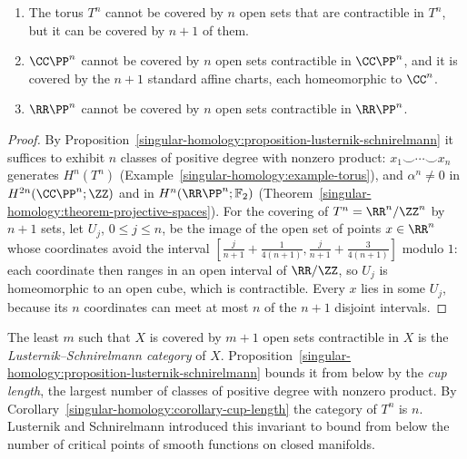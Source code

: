 \begin{corollary}\label{singular-homology:corollary-cup-length}
\begin{enumerate}
\item The torus $T^n$ cannot be covered by $n$ open sets that are contractible in $T^n$, but it can be covered by $n + 1$ of them.
\item $\CC\PP^n$ cannot be covered by $n$ open sets contractible in $\CC\PP^n$, and it is covered by the $n + 1$ standard affine charts, each homeomorphic to $\CC^n$.
\item $\RR\PP^n$ cannot be covered by $n$ open sets contractible in $\RR\PP^n$.
\end{enumerate}
\end{corollary}

\begin{proof}
By Proposition~\ref{singular-homology:proposition-lusternik-schnirelmann} it suffices to exhibit $n$ classes of positive degree with nonzero product: $x_1 \smile \cdots \smile x_n$ generates $H^n(T^n)$
(Example~\ref{singular-homology:example-torus}), and $\alpha^n \neq 0$ in $H^{2n}(\CC\PP^n; \ZZ)$ and in $H^n(\RR\PP^n; \mathbb{F}_2)$ (Theorem~\ref{singular-homology:theorem-projective-spaces}). For the
covering of $T^n = \RR^n/\ZZ^n$ by $n + 1$ sets, let $U_j$, $0 \leq j \leq n$, be the image of the open set of points $x \in \RR^n$ whose coordinates avoid the interval
$[\frac{j}{n+1} + \frac{1}{4(n+1)}, \frac{j}{n+1} + \frac{3}{4(n+1)}]$ modulo $1$: each coordinate then ranges in an open interval of $\RR/\ZZ$, so $U_j$ is homeomorphic to an open cube, which is contractible.
Every $x$ lies in some $U_j$, because its $n$ coordinates can meet at most $n$ of the $n + 1$ disjoint intervals.
\end{proof}

\begin{remark}\label{singular-homology:remark-ls-category}
The least $m$ such that $X$ is covered by $m + 1$ open sets contractible in $X$ is the \emph{Lusternik--Schnirelmann category} of $X$. Proposition~\ref{singular-homology:proposition-lusternik-schnirelmann} bounds it from
below by the \emph{cup length}, the largest number of classes of positive degree with nonzero product. By Corollary~\ref{singular-homology:corollary-cup-length} the category of $T^n$ is $n$. Lusternik and
Schnirelmann introduced this invariant to bound from below the number of critical points of smooth functions on closed manifolds.
\end{remark}

